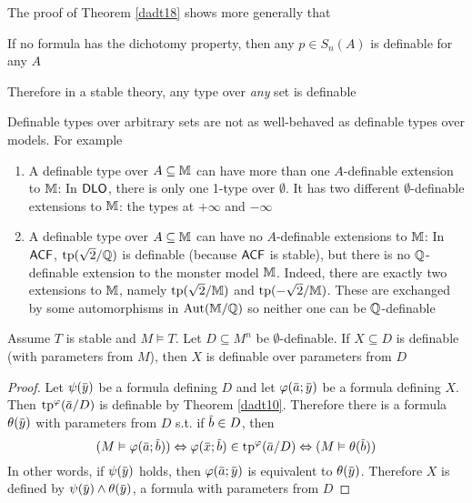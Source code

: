 \documentclass[11pt]{article}
\begin{document}
The proof of Theorem \ref{dadt18} shows more generally that
\begin{center}
If no formula has the dichotomy property, then any \(p\in S_n(A)\) is definable for any \(A\)
\end{center}

Therefore in a stable theory, any type over \emph{any} set is definable

\begin{warning}
Definable types over arbitrary sets are not as well-behaved as definable types over models. For
example
\begin{enumerate}
\item A definable type over \(A\subseteq\mathbb{M}\) can have more than one \(A\)-definable extension to \(\mathbb{M}\):
In \(\operatorname{\textsf{DLO}}\), there is only one 1-type over \(\emptyset\). It has two different \(\emptyset\)-definable
extensions to \(\mathbb{M}\): the types at \(+\infty\) and \(-\infty\)
\item A definable type over \(A\subseteq\mathbb{M}\) can have no \(A\)-definable extensions to \(\mathbb{M}\):
In \(\textsf{ACF}\), \(\operatorname{tp}(\sqrt{2}/\mathbb{Q})\) is definable  (because \(\textsf{ACF}\) is stable), but there is
no \(\mathbb{Q}\)-definable extension to the monster model \(\mathbb{M}\). Indeed, there are exactly two
extensions to \(\mathbb{M}\), namely \(\operatorname{tp}(\sqrt{2}/\mathbb{M})\) and \(\operatorname{tp}(-\sqrt{2}/\mathbb{M})\). These are exchanged
by some automorphisms in \(\operatorname{\text{Aut}}(\mathbb{M}/\mathbb{Q})\) so neither one can be \(\mathbb{Q}\)-definable
\end{enumerate}
\end{warning}

\begin{theorem}[]
Assume \(T\) is stable and \(M\vDash T\). Let \(D\subseteq M^n\) be \(\emptyset\)-definable. If \(X\subseteq D\) is definable
(with parameters from \(M\)), then \(X\) is definable over parameters from \(D\)
\end{theorem}

\begin{proof}
Let \(\psi(\bary)\) be a formula defining \(D\) and let \(\varphi(\bara;\bary)\) be a formula
defining \(X\). Then \(\tp^\varphi(\bara/D)\) is definable by Theorem \ref{dadt10}. Therefore there is a
formula \(\theta(\bary)\) with parameters from \(D\) s.t. if \(\barb\in D\), then
\begin{equation*}
(M\vDash\varphi(\bara;\barb))\Leftrightarrow\varphi(\barx;\barb)\in\tp^\varphi(\bara/D)\Leftrightarrow(M\vDash\theta(\barb))
\end{equation*}
In other words, if \(\psi(\bary)\) holds, then \(\varphi(\bara;\bary)\) is equivalent to \(\theta(\bary)\).
Therefore \(X\) is defined by \(\psi(\bary)\wedge\theta(\bary)\), a formula with parameters from \(D\)
\end{proof}
\end{document}
